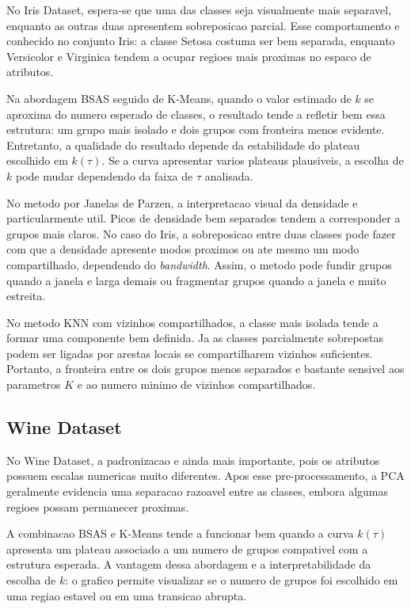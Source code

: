 \documentclass[12pt,a4paper]{article}
\begin{document}
No Iris Dataset, espera-se que uma das classes seja visualmente mais separavel,
enquanto as outras duas apresentem sobreposicao parcial. Esse comportamento e
conhecido no conjunto Iris: a classe Setosa costuma ser bem separada, enquanto
Versicolor e Virginica tendem a ocupar regioes mais proximas no espaco de
atributos.

Na abordagem BSAS seguido de K-Means, quando o valor estimado de $k$ se aproxima
do numero esperado de classes, o resultado tende a refletir bem essa estrutura:
um grupo mais isolado e dois grupos com fronteira menos evidente. Entretanto, a
qualidade do resultado depende da estabilidade do plateau escolhido em
$k(\tau)$. Se a curva apresentar varios plateaus plausiveis, a escolha de $k$
pode mudar dependendo da faixa de $\tau$ analisada.

No metodo por Janelas de Parzen, a interpretacao visual da densidade e
particularmente util. Picos de densidade bem separados tendem a corresponder a
grupos mais claros. No caso do Iris, a sobreposicao entre duas classes pode
fazer com que a densidade apresente modos proximos ou ate mesmo um modo
compartilhado, dependendo do \textit{bandwidth}. Assim, o metodo pode fundir
grupos quando a janela e larga demais ou fragmentar grupos quando a janela e
muito estreita.

No metodo KNN com vizinhos compartilhados, a classe mais isolada tende a formar
uma componente bem definida. Ja as classes parcialmente sobrepostas podem ser
ligadas por arestas locais se compartilharem vizinhos suficientes. Portanto, a
fronteira entre os dois grupos menos separados e bastante sensivel aos
parametros $K$ e ao numero minimo de vizinhos compartilhados.

\subsection{Wine Dataset}

No Wine Dataset, a padronizacao e ainda mais importante, pois os atributos
possuem escalas numericas muito diferentes. Apos esse pre-processamento, a PCA
geralmente evidencia uma separacao razoavel entre as classes, embora algumas
regioes possam permanecer proximas.

A combinacao BSAS e K-Means tende a funcionar bem quando a curva $k(\tau)$
apresenta um plateau associado a um numero de grupos compativel com a estrutura
esperada. A vantagem dessa abordagem e a interpretabilidade da escolha de $k$:
o grafico permite visualizar se o numero de grupos foi escolhido em uma regiao
estavel ou em uma transicao abrupta.
\end{document}
